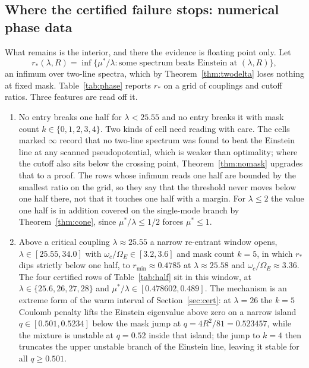 \documentclass[11pt]{article}
\newcommand{\OmE}{\Omega_E}
\newcommand{\muS}{\mu^{*}}
\theoremstyle{definition}
\theoremstyle{remark}
\begin{document}
\subsection{Where the certified failure stops: numerical phase data}\label{sec:half:num}

What remains is the interior, and there the evidence is floating point only. Let
\[
r_*(\lambda,R)=\inf\big\{\muS/\lambda:\text{some spectrum beats Einstein at }
(\lambda,R)\big\},
\]
an infimum over two-line spectra, which by Theorem~\ref{thm:twodelta} loses nothing at
fixed mask. Table~\ref{tab:phase} reports $r_*$ on a grid of couplings and cutoff ratios.
Three features are read off it.

\begin{enumerate}[label=(\arabic*),leftmargin=2.2em]
\item No entry breaks one half for $\lambda<25.55$ and no entry breaks it with mask count
$k\in\{0,1,2,3,4\}$. Two kinds of cell need reading with care. The cells marked $\infty$
record that no two-line spectrum was found to beat the Einstein line at any scanned
pseudopotential, which is weaker than optimality; where the cutoff also sits below the
crossing point, Theorem~\ref{thm:nomask} upgrades that to a proof. The rows whose infimum
reads one half are bounded by the smallest ratio on the grid, so they say that the
threshold never moves below one half there, not that it touches one half with a margin.
For $\lambda\le2$ the value one half is in addition covered on the single-mode branch by
Theorem~\ref{thm:cone}, since $\muS/\lambda\le1/2$ forces $\muS\le1$.
\item Above a critical coupling $\lambda\approx25.55$ a narrow re-entrant window opens,
$\lambda\in[25.55,34.0]$ with $\omega_c/\OmE\in[3.2,3.6]$ and mask count $k=5$, in which
$r_*$ dips strictly below one half, to $r_{\min}\approx0.4785$ at
$\lambda\approx25.58$ and $\omega_c/\OmE\approx3.36$. The four certified rows of Table~\ref{tab:half} sit in this
window, at $\lambda\in\{25.6,26,27,28\}$ and $\muS/\lambda\in[0.478602,0.489]$. The
mechanism is an extreme form of the warm interval of Section~\ref{sec:cert}: at
$\lambda=26$ the $k=5$ Coulomb penalty lifts the Einstein eigenvalue above zero on a narrow
island $q\in[0.501,0.5234]$ below the mask jump at $q=4R^2/81=0.523457$, while the
mixture is unstable at $q=0.52$ inside that island; the jump to $k=4$ then truncates the
upper unstable branch of the Einstein line, leaving it stable for all $q\ge0.501$.

\end{enumerate}
\end{document}
